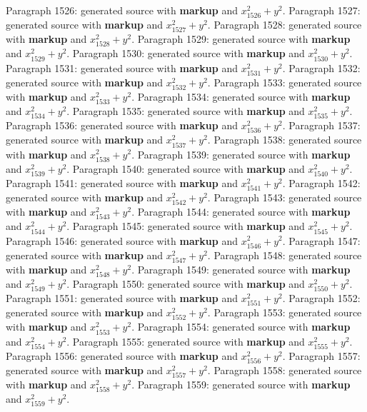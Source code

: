 \documentclass{article}
\begin{document}
Paragraph 1526: generated source with \textbf{markup} and $x_{1526}^2 + y^2$.
Paragraph 1527: generated source with \textbf{markup} and $x_{1527}^2 + y^2$.
Paragraph 1528: generated source with \textbf{markup} and $x_{1528}^2 + y^2$.
Paragraph 1529: generated source with \textbf{markup} and $x_{1529}^2 + y^2$.
Paragraph 1530: generated source with \textbf{markup} and $x_{1530}^2 + y^2$.
Paragraph 1531: generated source with \textbf{markup} and $x_{1531}^2 + y^2$.
Paragraph 1532: generated source with \textbf{markup} and $x_{1532}^2 + y^2$.
Paragraph 1533: generated source with \textbf{markup} and $x_{1533}^2 + y^2$.
Paragraph 1534: generated source with \textbf{markup} and $x_{1534}^2 + y^2$.
Paragraph 1535: generated source with \textbf{markup} and $x_{1535}^2 + y^2$.
Paragraph 1536: generated source with \textbf{markup} and $x_{1536}^2 + y^2$.
Paragraph 1537: generated source with \textbf{markup} and $x_{1537}^2 + y^2$.
Paragraph 1538: generated source with \textbf{markup} and $x_{1538}^2 + y^2$.
Paragraph 1539: generated source with \textbf{markup} and $x_{1539}^2 + y^2$.
Paragraph 1540: generated source with \textbf{markup} and $x_{1540}^2 + y^2$.
Paragraph 1541: generated source with \textbf{markup} and $x_{1541}^2 + y^2$.
Paragraph 1542: generated source with \textbf{markup} and $x_{1542}^2 + y^2$.
Paragraph 1543: generated source with \textbf{markup} and $x_{1543}^2 + y^2$.
Paragraph 1544: generated source with \textbf{markup} and $x_{1544}^2 + y^2$.
Paragraph 1545: generated source with \textbf{markup} and $x_{1545}^2 + y^2$.
Paragraph 1546: generated source with \textbf{markup} and $x_{1546}^2 + y^2$.
Paragraph 1547: generated source with \textbf{markup} and $x_{1547}^2 + y^2$.
Paragraph 1548: generated source with \textbf{markup} and $x_{1548}^2 + y^2$.
Paragraph 1549: generated source with \textbf{markup} and $x_{1549}^2 + y^2$.
Paragraph 1550: generated source with \textbf{markup} and $x_{1550}^2 + y^2$.
Paragraph 1551: generated source with \textbf{markup} and $x_{1551}^2 + y^2$.
Paragraph 1552: generated source with \textbf{markup} and $x_{1552}^2 + y^2$.
Paragraph 1553: generated source with \textbf{markup} and $x_{1553}^2 + y^2$.
Paragraph 1554: generated source with \textbf{markup} and $x_{1554}^2 + y^2$.
Paragraph 1555: generated source with \textbf{markup} and $x_{1555}^2 + y^2$.
Paragraph 1556: generated source with \textbf{markup} and $x_{1556}^2 + y^2$.
Paragraph 1557: generated source with \textbf{markup} and $x_{1557}^2 + y^2$.
Paragraph 1558: generated source with \textbf{markup} and $x_{1558}^2 + y^2$.
Paragraph 1559: generated source with \textbf{markup} and $x_{1559}^2 + y^2$.
\end{document}
